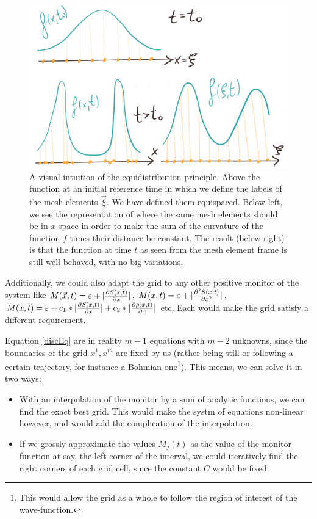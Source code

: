 \documentclass[11pt, a4paper]{article} %
\begin{document}
\begin{figure}[h!]
  \centering
    \includegraphics[width=0.65\linewidth]{8equidistribution.png}
  \caption{ A visual intuition of the equidistribution principle. Above the function at an initial reference time in which we define the labels of the mesh elements $\vec{\xi}$. We have defined them equispaced. Below left, we see the representation of where the same mesh elements should be in $x$ space in order to make the sum of the curvature of the function $f$ times their distance be constant. The result (below right) is that the function at time $t$ as seen from the mesh element frame is still well behaved, with no big variations. }
  \label{fig:equid}
\end{figure}

Additionally, we could also adapt the grid to any other positive monitor of the system like $M(\vec{x},t)=\varepsilon+|\pdv{S(x,t)}{x}|$, $M(x,t)=\varepsilon+|\pdv[2]{S(x,t)}{x}|$, $M(x,t)=\varepsilon+c_1*|\pdv{S(x,t)}{x}|+c_2*|\pdv{\rho(x,t)}{x}|$ etc. Each would make the grid satisfy a different requirement.

Equation \eqref{discEq} are in reality $m-1$ equations with $m-2$ unknowns, since the boundaries of the grid $x^1, x^m$ are fixed by us (rather being still or following a certain trajectory, for instance a Bohmian one\footnote{This would allow the grid as a whole to follow the region of interest of the wave-function.}). This means, we can solve it in two ways: 
\begin{itemize}
\item With an interpolation of the monitor by a sum of analytic functions, we can find the exact best grid. This would make the systm of equations non-linear however, and would add the complication of the interpolation.

\item If we grossly approximate the values $M_j(t)$ as the value of the monitor function at say, the left corner of the interval, we could iteratively find the right corners of each grid cell, since the constant $C$ would be fixed.
\end{itemize}
\end{document}

